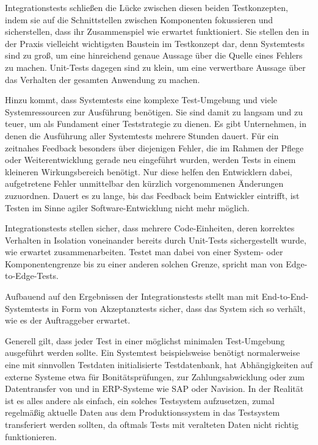 Integrationstests schließen die Lücke zwischen diesen beiden Testkonzepten, indem sie
auf die Schnittstellen zwischen Komponenten fokussieren und sicherstellen, dass ihr Zusammenspiel
wie erwartet funktioniert. Sie stellen den in der Praxis vielleicht wichtigsten
Baustein im Testkonzept dar, denn Systemtests sind zu groß, um eine hinreichend genaue
Aussage über die Quelle eines Fehlers zu machen. Unit-Tests dagegen sind zu klein, um
eine verwertbare Aussage über das Verhalten der gesamten Anwendung zu machen.

Hinzu kommt, dass Systemtests eine komplexe Test-Umgebung und viele Systemressourcen
zur Ausführung benötigen. Sie sind damit zu langsam und zu teuer, um als Fundament
einer Teststrategie zu dienen. Es gibt Unternehmen, in denen die Ausführung aller
Systemtests mehrere Stunden dauert. Für ein zeitnahes Feedback besonders über
diejenigen Fehler, die im Rahmen der Pflege oder Weiterentwicklung gerade neu eingeführt
wurden, werden Tests in einem kleineren Wirkungsbereich benötigt. Nur diese helfen den
Entwicklern dabei, aufgetretene Fehler unmittelbar den kürzlich vorgenommenen Änderungen
zuzuordnen. Dauert es zu lange, bis das Feedback beim Entwickler eintrifft, ist Testen
im Sinne agiler Software-Entwicklung nicht mehr möglich.

Integrationstests stellen sicher, dass mehrere Code-Einheiten, deren korrektes Verhalten in
Isolation voneinander bereits durch Unit-Tests sichergestellt wurde, wie erwartet zusammenarbeiten.
Testet man dabei von einer System- oder Komponentengrenze bis zu einer anderen solchen Grenze, spricht
man von Edge-to-Edge-Tests.

Aufbauend auf den Ergebnissen der Integrationstests stellt man mit End-to-End-Systemtests in
Form von Akzeptanztests sicher, dass das System sich so verhält, wie es der Auftraggeber erwartet.

Generell gilt, dass jeder Test in einer möglichst minimalen Test-Umgebung ausgeführt werden
sollte. Ein Systemtest beispielsweise benötigt normalerweise eine mit sinnvollen Testdaten
initialisierte Testdatenbank, hat Abhängigkeiten auf externe Systeme etwa für Bonitätsprüfungen,
zur Zahlungsabwicklung oder zum Datentransfer von und in ERP-Systeme wie SAP oder Navision.
In der Realität ist es alles andere als einfach, ein solches Testsystem aufzusetzen, zumal
regelmäßig aktuelle Daten aus dem Produktionssystem in das Testsystem transferiert werden sollten,
da oftmals Tests mit veralteten Daten nicht richtig funktionieren.

